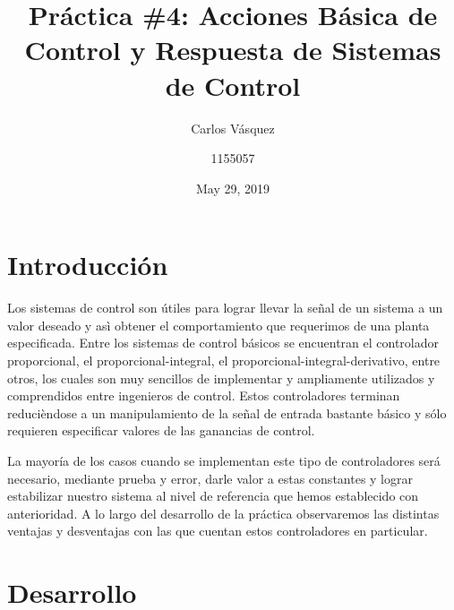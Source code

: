 \documentclass[12pt, letterpaper]{article}
\title{Práctica \#4: Acciones Básica de Control y Respuesta de Sistemas de Control}
\author{Carlos Vásquez \and 1155057}
\date{May 29, 2019}
\begin{document}
\maketitle
\section*{Introducción}

Los sistemas de control son útiles para lograr llevar la señal de un sistema a un valor deseado y asì obtener el comportamiento que requerimos de una planta especificada. Entre los sistemas de control básicos se encuentran el controlador proporcional, el proporcional-integral, el proporcional-integral-derivativo, entre otros, los cuales son muy sencillos de implementar y ampliamente utilizados y comprendidos entre ingenieros de control. Estos controladores terminan reducièndose a un manipulamiento de la señal de entrada bastante básico y sólo requieren especificar valores de las ganancias de control.

La mayoría de los casos cuando se implementan este tipo de controladores será necesario, mediante prueba y error, darle valor a estas constantes y lograr estabilizar nuestro sistema al nivel de referencia que hemos establecido con anterioridad. A lo largo del desarrollo de la práctica observaremos las distintas ventajas y desventajas con las que cuentan estos controladores en particular.

\section*{Desarrollo}
\end{document}
